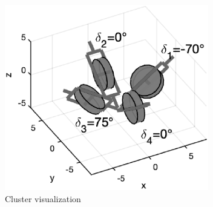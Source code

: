 \documentclass[journal]{new-aiaa}
\begin{document}
\begin{figure}[H]
\centering
\includegraphics[width=3.5in]{cmgvisual.eps}
\caption{Cluster visualization}
\label{fig:cmgvisual.eps}
\end{figure}
\end{document}
